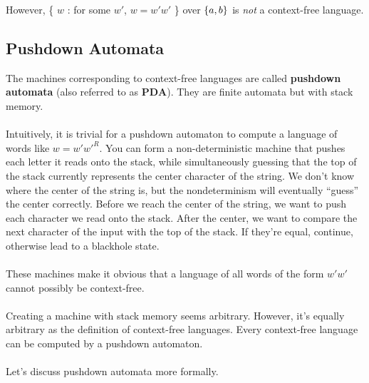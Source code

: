 \documentclass[]{article}
\DeclarePairedDelimiter{\set}{\lbrace}{\rbrace}
\theoremstyle{definition}
\begin{document}
      However, \{ $w$ : for some $w'$, $w = w'w'$ \} over $\set{a, b}$ is \emph{not} a context-free language.

    \subsection{Pushdown Automata}
      The machines corresponding to context-free languages are called \textbf{pushdown automata} (also referred to as $\textbf{PDA}$). They are finite automata but with stack memory.
      \\ \\
      Intuitively, it is trivial for a pushdown automaton to compute a language of words like $w = w' w'^R$. You can form a non-deterministic machine that pushes each letter it reads onto the stack, while simultaneously guessing that the top of the stack currently represents the center character of the string. We don't know where the center of the string is, but the nondeterminism will eventually ``guess'' the center correctly. Before we reach the center of the string, we want to push each character we read onto the stack. After the center, we want to compare the next character of the input with the top of the stack. If they're equal, continue, otherwise lead to a blackhole state.
      \\ \\
      These machines make it obvious that a language of all words of the form $w'w'$ cannot possibly be context-free.
      \\ \\
      Creating a machine with stack memory seems arbitrary. However, it's equally arbitrary as the definition of context-free languages. Every context-free language can be computed by a pushdown automaton.
      \\ \\
      Let's discuss pushdown automata more formally.
\end{document}
